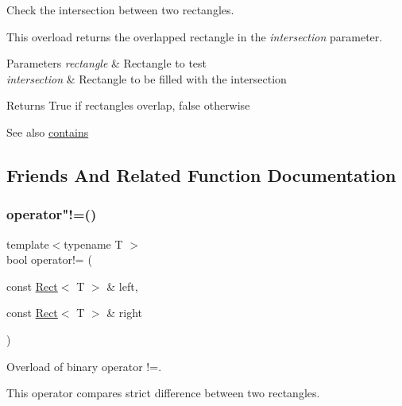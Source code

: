 Check the intersection between two rectangles. 

This overload returns the overlapped rectangle in the {\itshape intersection} parameter.


\begin{DoxyParams}{Parameters}
{\em rectangle} & Rectangle to test \\
\hline
{\em intersection} & Rectangle to be filled with the intersection\\
\hline
\end{DoxyParams}
\begin{DoxyReturn}{Returns}
True if rectangles overlap, false otherwise
\end{DoxyReturn}
\begin{DoxySeeAlso}{See also}
\mbox{\hyperlink{classsf_1_1_rect_a1d8a4a3aecec18310f6e3e23db43dfb8}{contains}} \begin{DoxyVerb}\end{DoxyVerb}
 
\end{DoxySeeAlso}


\subsection{Friends And Related Function Documentation}
\mbox{\label{classsf_1_1_rect_a03fc4c105687b7d0f07b6b4ed4b45581}} 
\subsubsection{\texorpdfstring{operator"!=()}{operator!=()}}
{\footnotesize\ttfamily template$<$typename T $>$ \\
bool operator!= (\begin{DoxyParamCaption}\item[{const \mbox{\hyperlink{classsf_1_1_rect}{Rect}}$<$ T $>$ \&}]{left,  }\item[{const \mbox{\hyperlink{classsf_1_1_rect}{Rect}}$<$ T $>$ \&}]{right }\end{DoxyParamCaption})\hspace{0.3cm}{\ttfamily [related]}}



Overload of binary operator !=. 

This operator compares strict difference between two rectangles.


